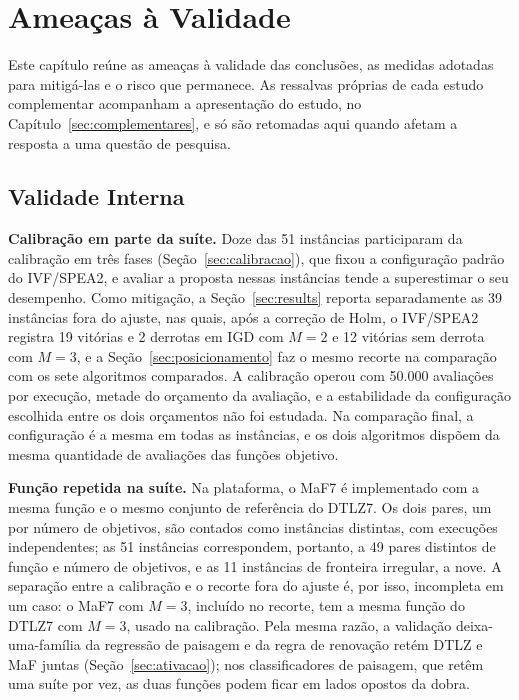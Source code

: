 \chapter{Ameaças à Validade}
\label{sec:threats}

Este capítulo reúne as ameaças à validade das conclusões, as medidas adotadas para mitigá-las e o risco que permanece. As ressalvas próprias de cada estudo complementar acompanham a apresentação do estudo, no Capítulo~\ref{sec:complementares}, e só são retomadas aqui quando afetam a resposta a uma questão de pesquisa.

\section{Validade Interna}
\label{sec:validade_interna}

\textbf{Calibração em parte da suíte.} Doze das 51 instâncias participaram da calibração em três fases (Seção~\ref{sec:calibracao}), que fixou a configuração padrão do IVF/SPEA2, e avaliar a proposta nessas instâncias tende a superestimar o seu desempenho. Como mitigação, a Seção~\ref{sec:results} reporta separadamente as 39 instâncias fora do ajuste, nas quais, após a correção de Holm, o IVF/SPEA2 registra 19 vitórias e 2 derrotas em IGD com $M = 2$ e 12 vitórias sem derrota com $M = 3$, e a Seção~\ref{sec:posicionamento} faz o mesmo recorte na comparação com os sete algoritmos comparados. A calibração operou com 50.000 avaliações por execução, metade do orçamento da avaliação, e a estabilidade da configuração escolhida entre os dois orçamentos não foi estudada. Na comparação final, a configuração é a mesma em todas as instâncias, e os dois algoritmos dispõem da mesma quantidade de avaliações das funções objetivo.

\textbf{Função repetida na suíte.} Na plataforma, o MaF7 é implementado com a mesma função e o mesmo conjunto de referência do DTLZ7. Os dois pares, um por número de objetivos, são contados como instâncias distintas, com execuções independentes; as 51 instâncias correspondem, portanto, a 49 pares distintos de função e número de objetivos, e as 11 instâncias de fronteira irregular, a nove. A separação entre a calibração e o recorte fora do ajuste é, por isso, incompleta em um caso: o MaF7 com $M = 3$, incluído no recorte, tem a mesma função do DTLZ7 com $M = 3$, usado na calibração. Pela mesma razão, a validação deixa-uma-família da regressão de paisagem e da regra de renovação retém DTLZ e MaF juntas (Seção~\ref{sec:ativacao}); nos classificadores de paisagem, que retêm uma suíte por vez, as duas funções podem ficar em lados opostos da dobra.

